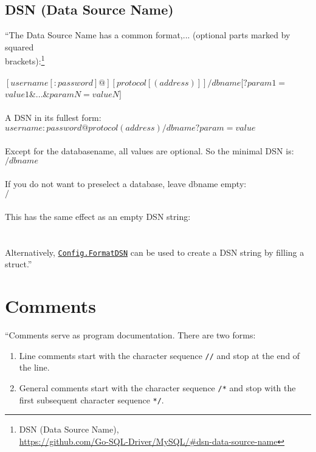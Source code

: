 \documentclass[12pt,letterpaper,dvips]{article}
\begin{document}
\newpage
\subsection{DSN (Data Source Name)}
``The Data Source Name has a common format,... (optional
parts marked by squared\\
brackets):\footnote{DSN (Data Source Name),\\
  \href{https://github.com/Go-SQL-Driver/MySQL/\#dsn-data-source-name}{https://github.com/Go-SQL-Driver/MySQL/\#dsn-data-source-name}}\\
\\
\indent $[username[:password]@][protocol[(address)]]/dbname[?param1=$\\
\indent \indent $value1$\&$...$\&$paramN=valueN]$\\
\\
A DSN in its fullest form:\\
\indent $username:password@protocol(address)/dbname?param=value$\\
\\
Except for the databasename, all values are optional. So the minimal DSN is:\\
\indent $/dbname$\\
\\
If you do not want to preselect a database, leave dbname empty:\\
\indent $/$\\
\\
This has the same effect as an empty DSN string:\\
\\
\\
Alternatively,
\texttt{\href{https://godoc.org/github.com/go-sql-driver/mysql\#Config.FormatDSN}{Config.FormatDSN}}
can be used to create a DSN string by filling a struct.''



\newpage
\section{Comments}
``Comments serve as program documentation. There are two
forms:

\begin{enumerate}
    \item Line comments start with the character sequence
      \texttt{//} and stop at the end of the line.
    \item General comments start with the character sequence
        \texttt{/*} and stop with the first subsequent
        character sequence \texttt{*/}.
\end{enumerate}
\end{document}

